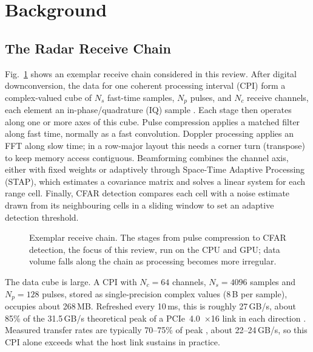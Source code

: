 \section{Background}
\label{sec:background}

\subsection{The Radar Receive Chain}
Fig.~\ref{fig:processing-chain} shows an exemplar receive chain considered in
this review.
After digital downconversion, the data for one coherent processing interval
(CPI) form a complex-valued cube of $N_s$ fast-time samples, $N_p$ pulses, and
$N_c$ receive channels, each element an in-phase/quadrature (IQ) sample
\cite{richardsPreviewBasicRadar2022}.
Each stage then operates along one or more axes of this cube.
Pulse compression applies a matched filter along fast time, normally as a fast
convolution.
Doppler processing applies an FFT along slow time; in a row-major layout this
needs a corner turn (transpose) to keep memory access contiguous.
Beamforming combines the channel axis, either with fixed weights or adaptively
through Space-Time Adaptive Processing (STAP), which estimates a covariance
matrix and solves a linear system for each range cell.
Finally, CFAR detection compares each cell with a noise estimate drawn from its
neighbouring cells in a sliding window to set an adaptive detection threshold.

\begin{figure}[!t]
    \centering
    \resizebox{0.9\linewidth}{!}{}
    \caption{Exemplar receive chain.
        The stages from pulse compression to CFAR detection, the focus of this review,
        run on the CPU and GPU; data volume falls along the chain as processing becomes
        more irregular.
    }
    \label{fig:processing-chain}
\end{figure}

The data cube is large.
A CPI with $N_c=64$ channels, $N_s=4096$ samples and $N_p=128$ pulses, stored
as single-precision complex values (8\,B per sample), occupies about 268\,MB.
Refreshed every 10\,ms, this is roughly 27\,GB/s, about 85\% of the 31.5\,GB/s
theoretical peak of a PCIe~4.0~$\times$16 link in each direction
\cite{nvidiaA100TensorCore2020}.
Measured transfer rates are typically 70--75\% of peak \cite{venterSOFTWAREDEFINEDPULSEDOPPLERRADAR},
about 22--24\,GB/s, so this CPI alone exceeds what the host link sustains in practice.

